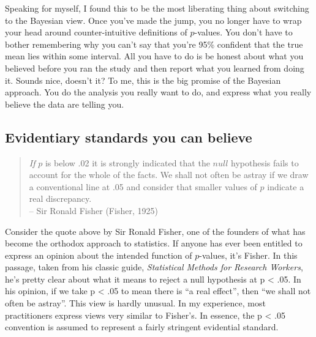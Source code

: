 \documentclass[
  a4paper,
]{book}
\begin{document}
Speaking for myself, I found this to be the most liberating thing about
switching to the Bayesian view. Once you've made the jump, you no longer
have to wrap your head around counter-intuitive definitions of
\(p\)-values. You don't have to bother remembering why you can't say
that you're 95\% confident that the true mean lies within some interval.
All you have to do is be honest about what you believed before you ran
the study and then report what you learned from doing it. Sounds nice,
doesn't it? To me, this is the big promise of the Bayesian approach. You
do the analysis you really want to do, and express what you really
believe the data are telling you.

\hypertarget{evidentiary-standards-you-can-believe}{%
\subsection{Evidentiary standards you can
believe}\label{evidentiary-standards-you-can-believe}}

\begin{quote}
\emph{If} \(p\) is below .02 it is strongly indicated that the \(null\)
hypothesis fails to account for the whole of the facts. We shall not
often be astray if we draw a conventional line at .05 and consider that
smaller values of \(p\) indicate a real discrepancy.\\
-- Sir Ronald Fisher (Fisher, 1925)
\end{quote}

Consider the quote above by Sir Ronald Fisher, one of the founders of
what has become the orthodox approach to statistics. If anyone has ever
been entitled to express an opinion about the intended function of
\(p\)-values, it's Fisher. In this passage, taken from his classic
guide, \emph{Statistical Methods for Research Workers}, he's pretty
clear about what it means to reject a null hypothesis at p \textless{}
.05. In his opinion, if we take p \textless{} .05 to mean there is ``a
real effect'', then ``we shall not often be astray''. This view is
hardly unusual. In my experience, most practitioners express views very
similar to Fisher's. In essence, the p \textless{} .05 convention is
assumed to represent a fairly stringent evidential standard.
\end{document}
